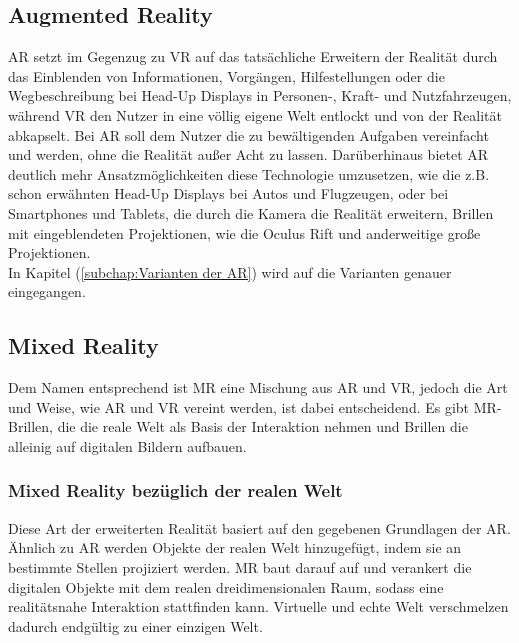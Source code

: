 \subsection*{Augmented Reality}
\ac{AR} setzt im Gegenzug zu \ac{VR} auf das tatsächliche Erweitern der Realität durch das Einblenden von Informationen, Vorgängen, Hilfestellungen
oder die Wegbeschreibung bei Head-Up Displays in Personen-, Kraft- und Nutzfahrzeugen, während \acl{VR} den Nutzer in eine völlig eigene 
Welt entlockt und von der Realität abkapselt. Bei \acs{AR} soll dem Nutzer die zu bewältigenden Aufgaben 
vereinfacht und 
werden, ohne die Realität außer Acht zu lassen. Darüberhinaus bietet \acl{AR} deutlich mehr Ansatzmöglichkeiten diese Technologie 
umzusetzen, wie die z.B. schon erwähnten Head-Up Displays bei Autos und Flugzeugen, oder bei Smartphones und Tablets, die durch die Kamera 
die Realität erweitern, Brillen mit eingeblendeten Projektionen, wie die Oculus Rift und anderweitige große Projektionen. 
\\ 
In Kapitel (\ref{subchap:Varianten der AR}) wird auf die Varianten genauer eingegangen. 

\subsection*{Mixed Reality}
Dem Namen entsprechend ist \ac{MR} eine Mischung aus \acl{AR} und \acl{VR}, jedoch die Art und Weise, wie \acs{AR} und \acs{VR} vereint 
werden, ist dabei entscheidend. Es gibt \acs{MR}-Brillen, die die reale Welt als Basis der Interaktion nehmen und Brillen die alleinig 
auf digitalen Bildern aufbauen. \cite{mr.2018o}
\subsubsection*{Mixed Reality bezüglich der realen Welt}
Diese Art der erweiterten Realität basiert auf den gegebenen Grundlagen der \acs{AR}. Ähnlich zu \acl{AR} werden Objekte der realen Welt 
hinzugefügt, indem sie an bestimmte Stellen projiziert werden. \acl{MR} baut darauf auf und verankert die digitalen Objekte mit dem realen
dreidimensionalen Raum, sodass eine realitätsnahe Interaktion stattfinden kann. Virtuelle und echte Welt verschmelzen dadurch endgültig zu 
einer einzigen Welt. 

